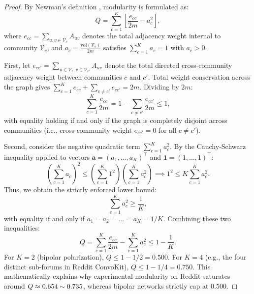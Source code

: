 \begin{proof}
By Newman's definition \citep{newman2006modularity}, modularity is formulated as:
\begin{equation}
    Q = \sum_{c=1}^K \left[ \frac{e_{cc}}{2m} - a_c^2 \right],
\end{equation}
where $e_{cc} = \sum_{u, v \in \mathcal{V}_c} A_{uv}$ denotes the total adjacency weight internal to community $\mathcal{V}_c$, and $a_c = \frac{\mathrm{vol}(\mathcal{V}_c)}{2m}$ satisfies $\sum_{c=1}^K a_c = 1$ with $a_c > 0$.

First, let $e_{cc'} = \sum_{u \in \mathcal{V}_c, v \in \mathcal{V}_{c'}} A_{uv}$ denote the total directed cross-community adjacency weight between communities $c$ and $c'$. Total weight conservation across the graph gives $\sum_{c=1}^K e_{cc} + \sum_{c \neq c'} e_{cc'} = 2m$. Dividing by $2m$:
\begin{equation}
    \sum_{c=1}^K \frac{e_{cc}}{2m} = 1 - \sum_{c \neq c'} \frac{e_{cc'}}{2m} \leq 1,
\end{equation}
with equality holding if and only if the graph is completely disjoint across communities (i.e., cross-community weight $e_{cc'} = 0$ for all $c \neq c'$).

Second, consider the negative quadratic term $\sum_{c=1}^K a_c^2$. By the Cauchy-Schwarz inequality applied to vectors $\mathbf{a} = (a_1, \dots, a_K)^\top$ and $\mathbf{1} = (1, \dots, 1)^\top$:
\begin{equation}
    \left( \sum_{c=1}^K a_c \right)^2 \leq \left( \sum_{c=1}^K 1^2 \right) \left( \sum_{c=1}^K a_c^2 \right) \implies 1^2 \leq K \sum_{c=1}^K a_c^2.
\end{equation}
Thus, we obtain the strictly enforced lower bound:
\begin{equation}
    \sum_{c=1}^K a_c^2 \geq \frac{1}{K},
\end{equation}
with equality if and only if $a_1 = a_2 = \dots = a_K = 1/K$. Combining these two inequalities:
\begin{equation}
    Q = \sum_{c=1}^K \frac{e_{cc}}{2m} - \sum_{c=1}^K a_c^2 \leq 1 - \frac{1}{K}.
\end{equation}
For $K=2$ (bipolar polarization), $Q \leq 1 - 1/2 = 0.500$. For $K=4$ (e.g., the four distinct sub-forums in Reddit ConvoKit), $Q \leq 1 - 1/4 = 0.750$. This mathematically explains why experimental modularity on Reddit saturates around $Q \approx 0.654 \sim 0.735$, whereas bipolar networks strictly cap at $0.500$.
\end{proof}

